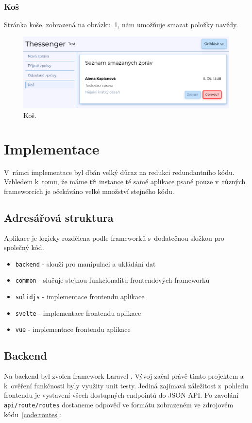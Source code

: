 \documentclass[
  master,
  program=ainf,
  tables=false,
  sourcecodes,
  glossaries,
  index
]{kidiplom}
\begin{document}
\subsubsection{Koš}
Stránka koše, zobrazená na obrázku~\ref{fig:bin}, nám umožňuje smazat položky navždy.

\begin{figure}[H]
  \centering
  \includegraphics[width=\textwidth]{graphics/thessenger_bin.png}
  \caption{Koš.}
  \label{fig:bin}
\end{figure}

\newpage
\section{Implementace}
V~rámci implementace byl dbán velký důraz na redukci redundantního kódu.
Vzhledem k~tomu, že máme tři instance té samé aplikace psané pouze v~různých
frameworcích je očekáváno velké množství stejného kódu.

\subsection{Adresářová struktura}
Aplikace je logicky rozdělena podle frameworků s~dodatečnou složkou pro společný kód.
\begin{itemize}
  \item {\tt backend} - slouží pro manipulaci a ukládání dat
  \item {\tt common} - slučuje stejnou funkcionalitu frontendových frameworků
  \item {\tt solidjs} - implementace frontendu aplikace
  \item {\tt svelte} - implementace frontendu aplikace
  \item {\tt vue} - implementace frontendu aplikace
\end{itemize}

\subsection{Backend}
Na backend byl zvolen framework Laravel \cite{laravel}. Vývoj začal právě tímto projektem a
k~ověření funkčnosti byly využity unit testy. Jediná zajímavá záležitost
z~pohledu frontendu je vystavení všech dostupných endpointů do JSON API. Po
zavolání {\tt api/route/routes} dostaneme odpověď ve formátu zobrazeném ve zdrojovém kódu~\ref{code:routes}:
\end{document}
